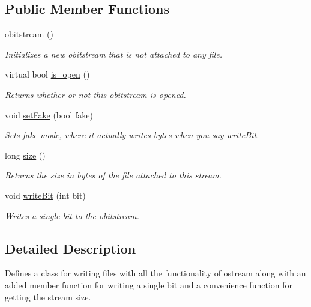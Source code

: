 \subsection*{Public Member Functions}
\begin{DoxyCompactItemize}
\item 
\mbox{\hyperlink{classobitstream_affc1b0bda48ee1c09b796e92ad7f8954}{obitstream}} ()
\begin{DoxyCompactList}\small\item\em Initializes a new obitstream that is not attached to any file. \end{DoxyCompactList}\item 
virtual bool \mbox{\hyperlink{classobitstream_a2f57f54d8c03b615bb31eee091d8a88a}{is\+\_\+open}} ()
\begin{DoxyCompactList}\small\item\em Returns whether or not this obitstream is opened. \end{DoxyCompactList}\item 
void \mbox{\hyperlink{classobitstream_ad916b4624eb09d375514964f867b475c}{set\+Fake}} (bool fake)
\begin{DoxyCompactList}\small\item\em Sets \textquotesingle{}fake\textquotesingle{} mode, where it actually writes bytes when you say write\+Bit. \end{DoxyCompactList}\item 
long \mbox{\hyperlink{classobitstream_a22727e9c338fb1aaa6722031445373c3}{size}} ()
\begin{DoxyCompactList}\small\item\em Returns the size in bytes of the file attached to this stream. \end{DoxyCompactList}\item 
void \mbox{\hyperlink{classobitstream_a487c88ba2560a4657d18c3edb7d9d247}{write\+Bit}} (int bit)
\begin{DoxyCompactList}\small\item\em Writes a single bit to the obitstream. \end{DoxyCompactList}\end{DoxyCompactItemize}


\subsection{Detailed Description}
Defines a class for writing files with all the functionality of ostream along with an added member function for writing a single bit and a convenience function for getting the stream size. 

